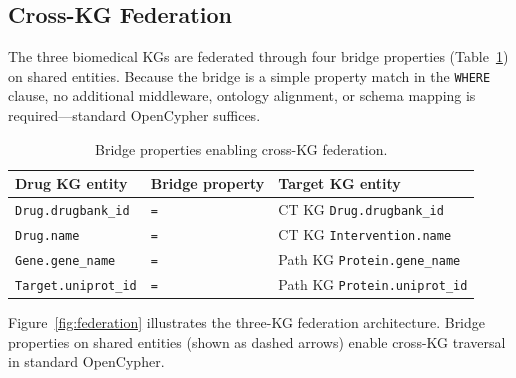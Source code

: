 \documentclass[sigconf, anonymous, review]{acmart}
\begin{document}
\subsection{Cross-KG Federation}\label{sec:federation}

The three biomedical KGs are federated through four bridge properties
(Table~\ref{tab:bridges}) on shared entities.  Because the bridge
is a simple property match in the \texttt{WHERE} clause, no
additional middleware, ontology alignment, or schema mapping is
required---standard OpenCypher suffices.

\begin{table}[t]
\centering
\caption{Bridge properties enabling cross-KG federation.}
\label{tab:bridges}
\small
\begin{tabular}{@{}lll@{}}
\toprule
\textbf{Drug KG entity} & \textbf{Bridge property} & \textbf{Target KG entity} \\
\midrule
\texttt{Drug.drugbank\_id}  & \texttt{=} & CT KG \texttt{Drug.drugbank\_id} \\
\texttt{Drug.name}          & \texttt{=} & CT KG \texttt{Intervention.name} \\
\texttt{Gene.gene\_name}    & \texttt{=} & Path KG \texttt{Protein.gene\_name} \\
\texttt{Target.uniprot\_id} & \texttt{=} & Path KG \texttt{Protein.uniprot\_id} \\
\bottomrule
\end{tabular}
\end{table}

Figure~\ref{fig:federation} illustrates the three-KG federation
architecture.  Bridge properties on shared entities (shown as dashed
arrows) enable cross-KG traversal in standard OpenCypher.
\end{document}
